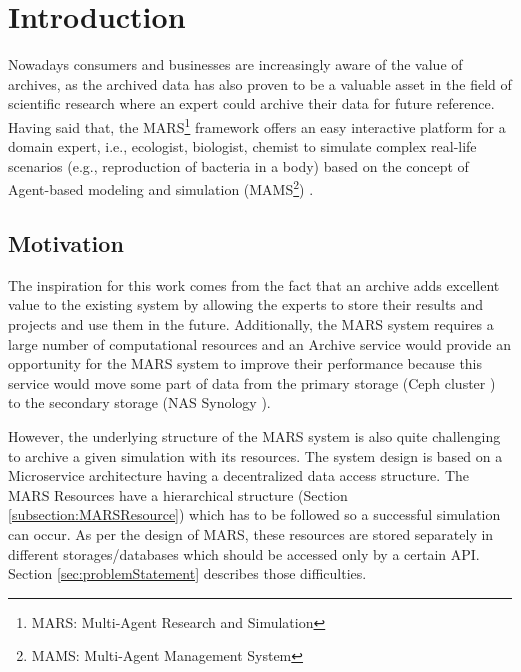 \frenchspacing
\newpage
    \chapter{Introduction}
    Nowadays consumers and businesses are increasingly aware of the value of archives, as the archived data has also proven
    to be a valuable asset in the field of scientific research where an expert could archive their data for future reference. Having said that, the 
    MARS\footnote{MARS: Multi-Agent Research and Simulation} framework offers an easy interactive platform for a domain expert, i.e., ecologist, biologist, 
    chemist to simulate complex real-life scenarios (e.g., reproduction of bacteria in a body) based on the concept of Agent-based modeling and simulation 
    (MAMS\footnote{MAMS: Multi-Agent Management System}) \cite{agentModeling}.

        \section{Motivation}
        The inspiration for this work comes from the fact that an archive adds excellent value to the existing system by allowing the experts to store 
        their results and projects and use them in the future. Additionally, the MARS system requires a large number of computational resources and
        an Archive service would provide an opportunity for the MARS system to improve their
        performance because this service would move some part of data from the primary storage (Ceph cluster \cite{Ceph}) to the secondary storage (NAS Synology \cite{Synology}). 

        However, the underlying structure of the MARS system is also quite challenging to archive 
        a given simulation with its resources. The system design is based on a Microservice architecture \cite{MicroserviceNewMan} having a decentralized data \cite{atomic} access structure. 
        The MARS Resources have a hierarchical
        structure (Section \ref{subsection:MARSResource}) which has to be followed so a successful simulation can occur. As per the design of MARS, these resources
        are stored separately in different storages/databases which should be accessed only by a certain API. Section
        \ref{sec:problemStatement} describes those difficulties.  


